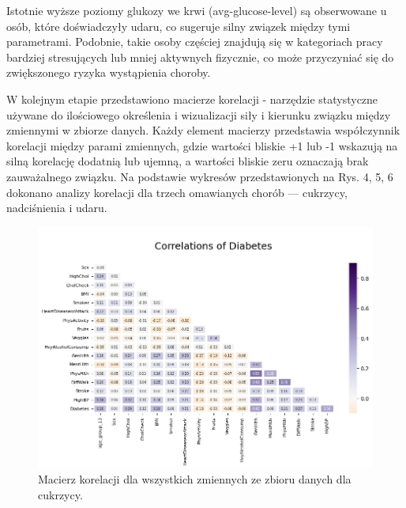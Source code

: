 \documentclass[onecolumn,12pt]{article}
\begin{document}
\vspace{8pt}
\noindent
Istotnie wyższe poziomy glukozy we krwi (avg-glucose-level) są obserwowane u osób, które doświadczyły udaru, co sugeruje silny związek między tymi parametrami. Podobnie, takie osoby częściej znajdują się w kategoriach pracy bardziej stresujących lub mniej aktywnych fizycznie, co może przyczyniać się do zwiększonego ryzyka wystąpienia choroby.

\vspace{8pt}
\noindent
W kolejnym etapie przedstawiono macierze korelacji - narzędzie statystyczne używane do ilościowego określenia i wizualizacji siły i kierunku związku między zmiennymi w zbiorze danych. Każdy element macierzy przedstawia współczynnik korelacji między parami zmiennych, gdzie wartości bliskie +1 lub -1 wskazują na silną korelację dodatnią lub ujemną, a wartości bliskie zeru oznaczają brak zauważalnego związku. Na podstawie wykresów przedstawionych na Rys. 4, 5, 6 dokonano analizy korelacji dla trzech omawianych chorób — cukrzycy, nadciśnienia i udaru. 

\begin{figure}[H]
    \centering
    \includegraphics[width=0.85\linewidth]{raport/graphs/diabetes_corr.png}
    \captionsetup{justification=centering}
    \caption{Macierz korelacji dla wszystkich zmiennych ze zbioru danych dla cukrzycy.}
    \label{fig:enter-label}
\end{figure}
\end{document}
